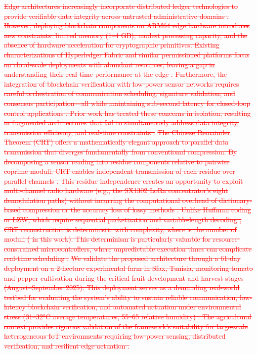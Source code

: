 \documentclass[pdflatex,sn-mathphys-num]{sn-jnl}
\theoremstyle{thmstyleone}
\theoremstyle{thmstyletwo}
\theoremstyle{thmstylethree}
\begin{document}
{\textcolor{red}{\sout{Edge architectures increasingly incorporate distributed ledger technologies to provide verifiable data integrity across untrusted administrative domains . However, deploying blockchain components on ARM64 edge hardware introduces new constraints: limited memory (1–4 GB), modest processing capacity, and the absence of hardware acceleration for cryptographic primitives. Existing characterizations of Hyperledger Fabric and similar permissioned platforms focus on cloud-scale deployments with abundant resources, leaving a gap in understanding their real-time performance at the edge . Furthermore, the integration of blockchain verification with low-power sensor networks requires careful orchestration of communication scheduling, signature validation, and consensus participation—all while maintaining sub-second latency for closed-loop control applications . Prior work has treated these concerns in isolation, resulting in fragmented architectures that fail to simultaneously address data integrity, transmission efficiency, and real-time constraints .}}
\textcolor{red}{\sout{The Chinese Remainder Theorem (CRT) offers a mathematically elegant approach to parallel data transmission that diverges fundamentally from conventional compression. By decomposing a sensor reading into residue components relative to pairwise coprime moduli, CRT enables independent transmission of each residue over parallel channels . This residue independence creates an opportunity to exploit multi-channel radio hardware (e.g., the SX1302 LoRa concentrator's eight demodulation paths) without incurring the computational overhead of dictionary-based compression or the accuracy loss of lossy methods . Unlike Huffman coding or LZW, which require sequential packetization and variable-length decoding , CRT reconstruction is deterministic with complexity, where is the number of moduli ( in this work). This determinism is particularly valuable for resource-constrained microcontrollers, where unpredictable execution times can complicate real-time scheduling .}}
\textcolor{red}{\sout{We validate the proposed architecture through a 61‑day deployment on a 2‑hectare experimental farm in Sfax, Tunisia, monitoring tomato and pepper cultivation during the critical fruit development and harvest stages (August–September 2025). This deployment serves as a demanding real-world testbed for evaluating the system's ability to sustain reliable communication, low-latency blockchain verification, and automated actuation under environmental stress (31–32°C average temperatures, 55–65 relative humidity) . The agricultural context provides rigorous validation of the framework's suitability for large‑scale heterogeneous IoT environments requiring low-power sensing, distributed verification, and resilient edge actuation .}}
}
\end{document}
